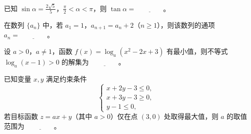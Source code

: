 \begin{question}
已知 \(\sin\alpha=\frac{2\sqrt5}{5}\)，\(\frac\pi2<\alpha<\pi\)，则 \(\tan\alpha=\underline{\qquad\qquad}\)。

\end{question}
\begin{question}
在数列 \(\{a_n\}\) 中，若 \(a_1=1\)，\(a_{n+1}=a_n+2\)（\(n\geqslant1\)），则该数列的通项 \(a_n=\underline{\qquad\qquad}\)。

\end{question}
\begin{question}
设 \(a>0\)，\(a\ne1\)，函数 \(f(x)=\log_a(x^2-2x+3)\) 有最小值，则不等式 \(\log_a(x-1)>0\) 的解集为 \(\underline{\qquad\qquad}\)。

\end{question}
\begin{question}
已知变量 \(x,y\) 满足约束条件
\nopagebreak[4]
\[
\begin{cases}
x+2y-3\leqslant0,\\
x+3y-3\geqslant0,\\
y-1\leqslant0,
\end{cases}
\]
若目标函数 \(z=ax+y\)（其中 \(a>0\)）仅在点 \((3,0)\) 处取得最大值，则 \(a\) 的取值范围为 \(\underline{\qquad\qquad}\)。

\end{question}

